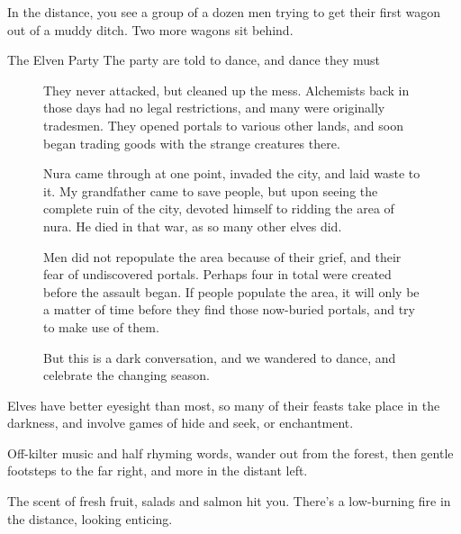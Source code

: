 \begin{multicols}{2}
\begin{boxtext}
  In the distance, you see a group of a dozen men trying to get their first wagon out of a muddy ditch.
  Two more wagons sit behind.
\end{boxtext}


{The Elven Party}%
{The party are told to dance, and dance they must}%

\begin{figure*}[b]
\begin{speechtext}

  They never attacked, but cleaned up the mess.  Alchemists back in those days had no legal restrictions, and many were originally tradesmen.  They opened portals to various other lands, and soon began trading goods with the strange creatures there.

  Nura came through at one point, invaded the city, and laid waste to it.  My grandfather came to save people, but upon seeing the complete ruin of the city, devoted himself to ridding the area of nura.  He died in that war, as so many other elves did.

  Men did not repopulate the area because of their grief, and their fear of undiscovered portals.
  Perhaps four in total were created before the assault began.
  If people populate the area, it will only be a matter of time before they find those now-buried portals, and try to make use of them.

  But this is a dark conversation, and we wandered to dance, and celebrate the changing season.

\end{speechtext}
\end{figure*}

Elves have better eyesight than most, so many of their feasts take place in the darkness, and involve games of hide and seek, or enchantment.

\begin{boxtext}

  Off-kilter music and half rhyming words, wander out from the forest, then gentle footsteps to the far right, and more in the distant left.

  The scent of fresh fruit, salads and salmon hit you.  There's a low-burning fire in the distance, looking enticing.

\end{boxtext}


\end{multicols}
